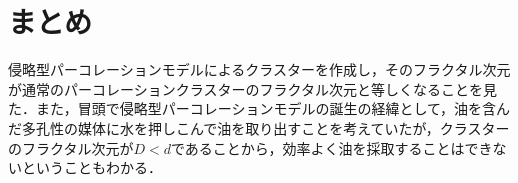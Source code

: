 \documentclass{jsarticle}
\begin{document}
\section{まとめ}

    侵略型パーコレーションモデルによるクラスターを作成し，そのフラクタル次元が通常のパーコレーションクラスターのフラクタル次元と等しくなることを見た．また，冒頭で侵略型パーコレーションモデルの誕生の経緯として，油を含んだ多孔性の媒体に水を押しこんで油を取り出すことを考えていたが，クラスターのフラクタル次元が$D<d$であることから，効率よく油を採取することはできないということもわかる．

\nocite{textbook}
\nocite{fractal1}

\end{document}
